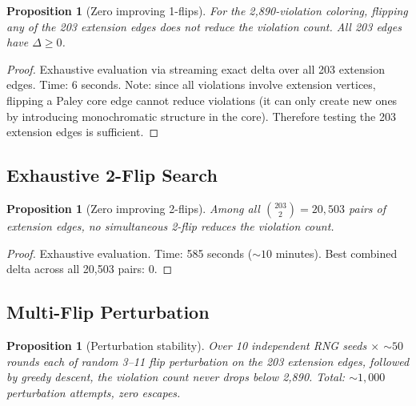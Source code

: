 \documentclass[11pt,a4paper]{article}
\theoremstyle{plain}
\newtheorem{proposition}[theorem]{Proposition}
\theoremstyle{remark}
\begin{document}
\begin{proposition}[Zero improving 1-flips]\label{prop:1flip}
For the 2{,}890-violation coloring, flipping any of the 203
extension edges does not reduce the violation count.
All 203 edges have $\Delta \geq 0$.
\end{proposition}

\begin{proof}
Exhaustive evaluation via streaming exact delta over all 203
extension edges. Time: 6 seconds.
Note: since all violations involve extension vertices, flipping a
Paley core edge cannot reduce violations (it can only create new
ones by introducing monochromatic structure in the core).
Therefore testing the 203 extension edges is sufficient.
\end{proof}

\subsection{Exhaustive 2-Flip Search}

\begin{proposition}[Zero improving 2-flips]\label{prop:2flip}
Among all $\binom{203}{2} = 20{,}503$ pairs of extension edges,
no simultaneous 2-flip reduces the violation count.
\end{proposition}

\begin{proof}
Exhaustive evaluation. Time: 585 seconds (${\sim}10$ minutes).
Best combined delta across all 20{,}503 pairs: 0.
\end{proof}

\subsection{Multi-Flip Perturbation}

\begin{proposition}[Perturbation stability]\label{prop:perturb}
Over 10 independent RNG seeds $\times$ ${\sim}50$ rounds each of
random 3--11 flip perturbation on the 203 extension edges, followed
by greedy descent, the violation count never drops below 2{,}890.
Total: ${\sim}1{,}000$ perturbation attempts, zero escapes.
\end{proposition}
\end{document}
